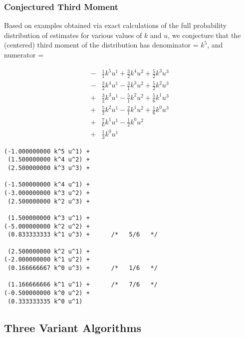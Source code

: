 \documentclass{sig-alternate}
\begin{document}
\subsubsection{Conjectured Third Moment}

Based on examples obtained via exact calculations of the full probability distribution of estimates
for various values of $k$ and $u$, we conjecture that the (centered) third moment of the distribution
has denominator = $k^5$, and numerator =

\begin{align*}
- & \frac{1}{1} k^5u^1 + \frac{3}{2} k^4u^2 + \frac{5}{2} k^3u^3  \\
- & \frac{3}{2} k^4u^1 - \frac{3}{1} k^3u^2 + \frac{5}{2} k^2u^3  \\
+ & \frac{3}{2} k^3u^1 - \frac{5}{1} k^2u^2 + \frac{5}{6} k^1u^3  \\
+ & \frac{5}{2} k^2u^1 - \frac{2}{1} k^1u^2 + \frac{1}{6} k^0u^3  \\
+ & \frac{7}{6} k^1u^1 - \frac{1}{2} k^0u^2  \\
+ & \frac{1}{3} k^0u^1 
\end{align*}

\begin{verbatim}
(-1.000000000 k^5 u^1) +
 (1.500000000 k^4 u^2) + 
 (2.500000000 k^3 u^3) + 
                        
(-1.500000000 k^4 u^1) +
(-3.000000000 k^3 u^2) +
 (2.500000000 k^2 u^3) + 
                        
 (1.500000000 k^3 u^1) + 
(-5.000000000 k^2 u^2) +
 (0.833333333 k^1 u^3) +      /*   5/6   */
                        
 (2.500000000 k^2 u^1) + 
(-2.000000000 k^1 u^2) +
 (0.166666667 k^0 u^3) +      /*   1/6   */
                        
 (1.166666666 k^1 u^1) +      /*   7/6   */
(-0.500000000 k^0 u^2) +
 (0.333333335 k^0 u^1)
\end{verbatim}

\subsection{Three Variant Algorithms}
\end{document}
